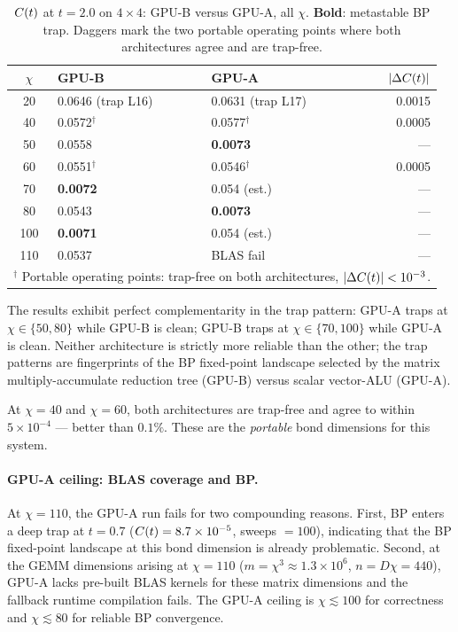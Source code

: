 \begin{table}[ht]
\centering
\caption{$C(t)$ at $t = 2.0$ on $4\times4$: GPU-B versus GPU-A, all $\chi$.
 \textbf{Bold}: metastable BP trap.
 Daggers mark the two portable operating points where both architectures agree
 and are trap-free.}
\label{tab:mi60_chi}
\begin{tabular}{cllr}
\toprule
$\chi$ & GPU-B & GPU-A & $|\Delta C(t)|$ \\
\midrule
20 & 0.0646 (trap L16) & 0.0631 (trap L17) & 0.0015 \\
40 & 0.0572$^\dagger$ & 0.0577$^\dagger$ & 0.0005 \\
50 & 0.0558 & \textbf{0.0073} & --- \\
60 & 0.0551$^\dagger$ & 0.0546$^\dagger$ & 0.0005 \\
70 & \textbf{0.0072} & 0.054 (est.) & --- \\
80 & 0.0543 & \textbf{0.0073} & --- \\
100 & \textbf{0.0071} & 0.054 (est.) & --- \\
110 & 0.0537 & BLAS fail & --- \\
\midrule
\multicolumn{4}{l}{$^\dagger$ Portable operating points: trap-free on both architectures,
 $|\Delta C(t)| < 10^{-3}$.}\\
\bottomrule
\end{tabular}
\end{table}

The results exhibit perfect complementarity in the trap pattern:
GPU-A traps at $\chi \in \{50, 80\}$ while GPU-B is clean;
GPU-B traps at $\chi \in \{70, 100\}$ while GPU-A is clean.
Neither architecture is strictly more reliable than the other;
the trap patterns are fingerprints of the BP fixed-point landscape
selected by the matrix multiply-accumulate reduction tree (GPU-B) versus scalar vector-ALU (GPU-A).

At $\chi=40$ and $\chi=60$, both architectures are trap-free and agree
to within $5\times10^{-4}$ --- better than $0.1\%$.
These are the \emph{portable} bond dimensions for this system.

\paragraph{GPU-A ceiling: BLAS coverage and BP.}
At $\chi=110$, the GPU-A run fails for two compounding reasons.
First, BP enters a deep trap at $t=0.7$ ($C(t) = 8.7\times10^{-5}$,
sweeps $= 100$), indicating that the BP fixed-point landscape at this
bond dimension is already problematic.
Second, at the GEMM dimensions arising at $\chi=110$
($m = \chi^3 \approx 1.3\times10^6$, $n = D\chi = 440$),
GPU-A lacks pre-built BLAS kernels for these matrix dimensions and the fallback
runtime compilation fails.
The GPU-A ceiling is $\chi \lesssim 100$ for correctness and
$\chi \lesssim 80$ for reliable BP convergence.

